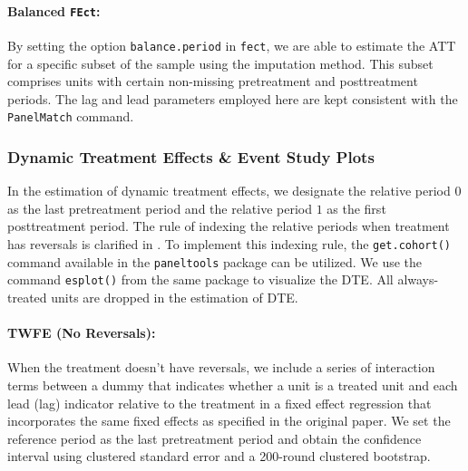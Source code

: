 \documentclass[12pt]{article}
\begin{document}
\paragraph*{Balanced \texttt{FEct}:} By setting the option \texttt{balance.period} in \texttt{fect}, we are able to estimate the ATT for a specific subset of the sample using the imputation method. This subset comprises units with certain non-missing pretreatment and posttreatment periods. The lag and lead parameters employed here are kept consistent with the \texttt{PanelMatch} command.

\subsubsection{Dynamic Treatment Effects \& Event Study Plots}

In the estimation of dynamic treatment effects, we designate the relative period $0$ as the last pretreatment period and the relative period $1$ as the first posttreatment period. The rule of indexing the relative periods when treatment has reversals is clarified in \citet{LWX2022}. To implement this indexing rule, the \texttt{get.cohort()} command available in the \texttt{paneltools} package can be utilized. We use the command \texttt{esplot()} from the same package to visualize the DTE. All always-treated units are dropped in the estimation of DTE.

\paragraph*{TWFE (No Reversals):} When the treatment doesn't have reversals, we include a series of interaction terms between a dummy that indicates whether a unit is a treated unit and each lead (lag) indicator relative to the treatment in a fixed effect regression that incorporates the same fixed effects as specified in the original paper. We set the reference period as the last pretreatment period and obtain the confidence interval using clustered standard error and a 200-round clustered bootstrap.
\end{document}
